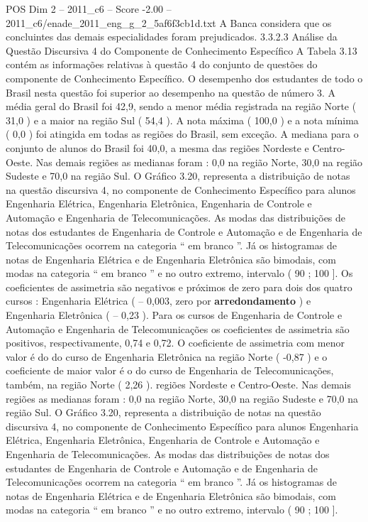 \begin{textsample}{POS Dim 2 – 2011\_c6 – Score -2.00 – 2011\_c6/enade\_2011\_eng\_g\_2\_5af6f3cb1d.txt}
A Banca considera que os concluintes das demais especialidades foram prejudicados. 3.3.2.3 Análise da Questão Discursiva 4 do Componente de Conhecimento Específico A Tabela 3.13 contém as informações relativas à questão 4 do conjunto de questões do componente de Conhecimento Específico.
O desempenho dos estudantes de todo o Brasil nesta questão foi superior ao desempenho na questão de número 3.
A média geral do Brasil foi 42,9, sendo a menor média registrada na região Norte ( 31,0 ) e a maior na região Sul ( 54,4 ).
A nota máxima ( 100,0 ) e a nota mínima ( 0,0 ) foi atingida em todas as regiões do Brasil, sem exceção.
A mediana para o conjunto de alunos do Brasil foi 40,0, a mesma das regiões Nordeste e Centro-Oeste.
Nas demais regiões as medianas foram : 0,0 na região Norte, 30,0 na região Sudeste e 70,0 na região Sul.
O Gráfico 3.20, representa a distribuição de notas na questão discursiva 4, no componente de Conhecimento Específico para alunos Engenharia Elétrica, Engenharia Eletrônica, Engenharia de Controle e Automação e Engenharia de Telecomunicações.
As modas das distribuições de notas dos estudantes de Engenharia de Controle e Automação e de Engenharia de Telecomunicações ocorrem na categoria “ em branco ”.
Já os histogramas de notas de Engenharia Elétrica e de Engenharia Eletrônica são bimodais, com modas na categoria “ em branco ” e no outro extremo, intervalo ( 90 ; 100 ].
Os coeficientes de assimetria são negativos e próximos de zero para dois dos quatro cursos : Engenharia Elétrica ( – 0,003, zero por \textbf{arredondamento} ) e Engenharia Eletrônica ( – 0,23 ).
Para os cursos de Engenharia de Controle e Automação e Engenharia de Telecomunicações os coeficientes de assimetria são positivos, respectivamente, 0,74 e 0,72.
O coeficiente de assimetria com menor valor é do do curso de Engenharia Eletrônica na região Norte ( -0,87 ) e o coeficiente de maior valor é o do curso de Engenharia de Telecomunicações, também, na região Norte ( 2,26 ). regiões Nordeste e Centro-Oeste.
Nas demais regiões as medianas foram : 0,0 na região Norte, 30,0 na região Sudeste e 70,0 na região Sul.
O Gráfico 3.20, representa a distribuição de notas na questão discursiva 4, no componente de Conhecimento Específico para alunos Engenharia Elétrica, Engenharia Eletrônica, Engenharia de Controle e Automação e Engenharia de Telecomunicações.
As modas das distribuições de notas dos estudantes de Engenharia de Controle e Automação e de Engenharia de Telecomunicações ocorrem na categoria “ em branco ”.
Já os histogramas de notas de Engenharia Elétrica e de Engenharia Eletrônica são bimodais, com modas na categoria “ em branco ” e no outro extremo, intervalo ( 90 ; 100 ].

\end{textsample}
